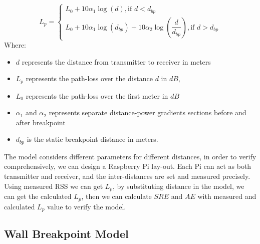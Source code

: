 \documentclass[10pt,conference]{IEEEtran}
\begin{document}
\begin{equation}
{L_p} = \left\{ {\begin{array}{*{20}{l}}
  {{L_0} + 10{\alpha_1}\log (d),{\text{if }}d < {d_{bp}}} \\ 
  {{L_0} + 10{\alpha_1}\log ({d_{bp}}) + 10{\alpha _2}\log \left( {\dfrac{d}{{{d_{bp}}}}} \right),{\text{if }}d > {d_{bp}}} 
\end{array}} \right.
\end{equation}
Where: 
\begin{itemize}
	\item $d$ represents the distance from transmitter to receiver in meters
	\item $L_p$ represents the path-loss over the distance $d$ in $dB$,
	\item $L_0$ represents the path-loss over the first meter in $dB$
	\item $\alpha_1$ and $\alpha_2$ represents separate distance-power gradients sections before and after breakpoint
	\item $d_{bp}$ is the static breakpoint distance in meters. 
\end{itemize}

The model considers different parameters for different distances, in order to verify comprehensively, we can design a Raspberry Pi lay-out. Each Pi can act as both transmitter and receiver, and the inter-distances are set and measured precisely. Using measured RSS we can get $L_p$, by substituting distance in the model, we can get the calculated $L_p$, then we can calculate $SRE$ and $AE$ with measured and calculated $L_p$ value to verify the model.



\subsection{Wall Breakpoint Model}
\end{document}
